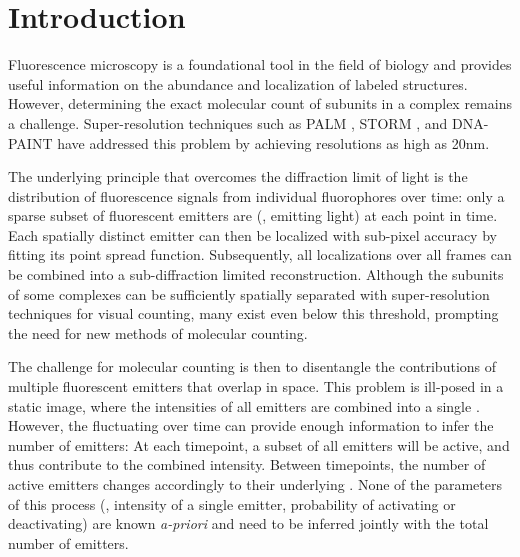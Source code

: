 \section{Introduction}

%
Fluorescence microscopy is a foundational tool in the field of biology and
provides useful information on the abundance and localization of labeled
structures.
%
  However, determining the exact molecular count of subunits in a complex
  remains a challenge. Super-resolution techniques such as PALM
  \cite{betzig_imaging_2006}, STORM \cite{rust_sub-diffraction-limit_2006}, and
  DNA-PAINT \cite{schnitzbauer_super-resolution_2017} have addressed this
  problem by achieving resolutions as high as 20nm.

%
The underlying principle that overcomes the diffraction limit of light is the
distribution of fluorescence signals from individual fluorophores over time:
%
  only a sparse subset of fluorescent emitters are 
  (\ie, emitting light) at each point in time.
  Each spatially distinct emitter can then be localized with sub-pixel accuracy
  by fitting its point spread function. Subsequently, all localizations over
  all frames can be combined into a sub-diffraction limited reconstruction.
  Although the subunits of some complexes can be sufficiently spatially
  separated with super-resolution techniques for visual counting, many exist
  even below this threshold, prompting the need for new methods of molecular
  counting.

%
The challenge for molecular counting is then to disentangle the contributions
of multiple fluorescent emitters that overlap in space.
%
  This problem is ill-posed in a static image, where the intensities of all
  emitters are combined into a single . However, the
  fluctuating  over time can provide enough
  information to infer the number of emitters:
  At each timepoint, a subset of all emitters will be active, and thus
  contribute to the combined intensity. Between timepoints, the number of
  active emitters changes accordingly to their underlying .
  None of the parameters of this process (\eg, intensity of a single emitter,
  probability of activating or deactivating) are known \emph{a-priori} and need
  to be inferred jointly with the total number of emitters.

